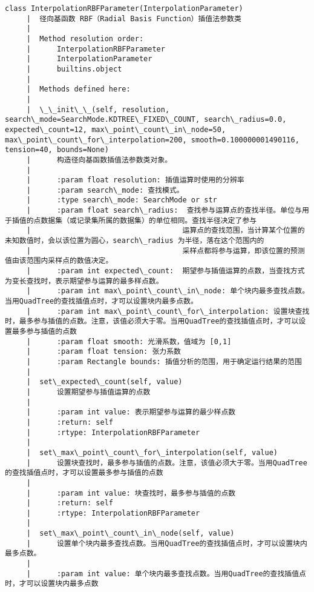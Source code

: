 \documentclass[11pt]{article}
\begin{document}
\begin{Verbatim}[commandchars=\\\{\}]
    class InterpolationRBFParameter(InterpolationParameter)
     |  径向基函数 RBF（Radial Basis Function）插值法参数类
     |  
     |  Method resolution order:
     |      InterpolationRBFParameter
     |      InterpolationParameter
     |      builtins.object
     |  
     |  Methods defined here:
     |  
     |  \_\_init\_\_(self, resolution, search\_mode=SearchMode.KDTREE\_FIXED\_COUNT, search\_radius=0.0, expected\_count=12, max\_point\_count\_in\_node=50, max\_point\_count\_for\_interpolation=200, smooth=0.100000001490116, tension=40, bounds=None)
     |      构造径向基函数插值法参数类对象。
     |      
     |      :param float resolution: 插值运算时使用的分辨率
     |      :param search\_mode: 查找模式。
     |      :type search\_mode: SearchMode or str
     |      :param float search\_radius:  查找参与运算点的查找半径。单位与用于插值的点数据集（或记录集所属的数据集）的单位相同。查找半径决定了参与
     |                                   运算点的查找范围，当计算某个位置的未知数值时，会以该位置为圆心，search\_radius 为半径，落在这个范围内的
     |                                   采样点都将参与运算，即该位置的预测值由该范围内采样点的数值决定。
     |      :param int expected\_count:  期望参与插值运算的点数，当查找方式为变长查找时，表示期望参与运算的最多样点数。
     |      :param int max\_point\_count\_in\_node: 单个块内最多查找点数。当用QuadTree的查找插值点时，才可以设置块内最多点数。
     |      :param int max\_point\_count\_for\_interpolation: 设置块查找时，最多参与插值的点数。注意，该值必须大于零。当用QuadTree的查找插值点时，才可以设置最多参与插值的点数
     |      :param float smooth: 光滑系数，值域为 [0,1]
     |      :param float tension: 张力系数
     |      :param Rectangle bounds: 插值分析的范围，用于确定运行结果的范围
     |  
     |  set\_expected\_count(self, value)
     |      设置期望参与插值运算的点数
     |      
     |      :param int value: 表示期望参与运算的最少样点数
     |      :return: self
     |      :rtype: InterpolationRBFParameter
     |  
     |  set\_max\_point\_count\_for\_interpolation(self, value)
     |      设置块查找时，最多参与插值的点数。注意，该值必须大于零。当用QuadTree的查找插值点时，才可以设置最多参与插值的点数
     |      
     |      :param int value: 块查找时，最多参与插值的点数
     |      :return: self
     |      :rtype: InterpolationRBFParameter
     |  
     |  set\_max\_point\_count\_in\_node(self, value)
     |      设置单个块内最多查找点数。当用QuadTree的查找插值点时，才可以设置块内最多点数。
     |      
     |      :param int value: 单个块内最多查找点数。当用QuadTree的查找插值点时，才可以设置块内最多点数

\end{Verbatim}
\end{document}
